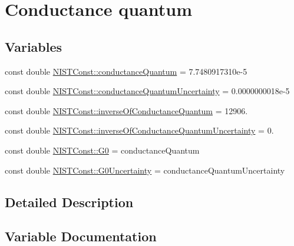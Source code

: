 \hypertarget{group___n_i_s_t_const-_conductance_quantum}{}\section{Conductance quantum}
\label{group___n_i_s_t_const-_conductance_quantum}
\subsection*{Variables}
\begin{DoxyCompactItemize}
\item 
const double \hyperlink{group___n_i_s_t_const-_conductance_quantum_gac57088a56b37d0b899d3e9c9babaadaf}{N\+I\+S\+T\+Const\+::conductance\+Quantum} = 7.\+7480917310e-\/5
\item 
const double \hyperlink{group___n_i_s_t_const-_conductance_quantum_ga599b808b8a742da1bb97cdb68f65cbf9}{N\+I\+S\+T\+Const\+::conductance\+Quantum\+Uncertainty} = 0.\+0000000018e-\/5
\item 
const double \hyperlink{group___n_i_s_t_const-_conductance_quantum_ga39f726a47f146a434d7fca49fc2aeb30}{N\+I\+S\+T\+Const\+::inverse\+Of\+Conductance\+Quantum} = 12906.
\item 
const double \hyperlink{group___n_i_s_t_const-_conductance_quantum_ga952c117f8b62615110f13d95c70075cd}{N\+I\+S\+T\+Const\+::inverse\+Of\+Conductance\+Quantum\+Uncertainty} = 0.
\item 
const double \hyperlink{group___n_i_s_t_const-_conductance_quantum_ga04bee7105fe6a217430a2db2913e7754}{N\+I\+S\+T\+Const\+::\+G0} = conductance\+Quantum
\item 
const double \hyperlink{group___n_i_s_t_const-_conductance_quantum_gab513ebf6083eb652771a17515e895301}{N\+I\+S\+T\+Const\+::\+G0\+Uncertainty} = conductance\+Quantum\+Uncertainty
\end{DoxyCompactItemize}


\subsection{Detailed Description}


\subsection{Variable Documentation}
\mbox{\label{group___n_i_s_t_const-_conductance_quantum_gac57088a56b37d0b899d3e9c9babaadaf}} 
